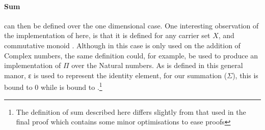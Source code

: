 \paragraph{Sum} can then be defined over the one dimensional case.
One interesting observation of the implementation of  here, is that it is
defined for any carrier set $X$, and commutative monoid . 
Although in this case  is only used on the addition of Complex 
numbers, the same definition could, for example, be used to produce an
implementation of $\Pi$ over the Natural numbers. 
As  is defined in this general manor, ε is used to represent the identity 
element, for our summation ($\Sigma$), this is bound to 0 while  is bound 
to \AF{\_+\_}.\footnote{The definition of sum described here differs slightly from that used in the final proof which contains some minor optimisations to ease proofs}

